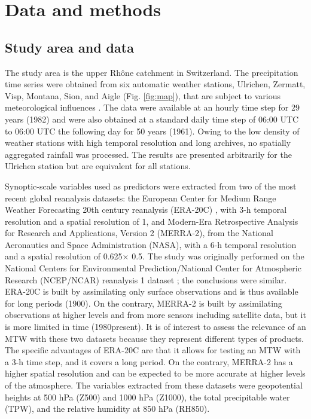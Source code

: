 \documentclass[hess, manuscript]{copernicus}
\begin{document}
	
	\section{Data and methods}
	\label{sec:data_methods}
	
	\subsection{Study area and data}
	\label{sec:data}
	
	The study area is the upper Rh\^{o}ne catchment in Switzerland. The precipitation time series were obtained from six automatic weather stations, Ulrichen, Zermatt, Visp, Montana, Sion, and Aigle (Fig. \ref{fig:map}), that are subject to various meteorological influences \citep{Horton2012}. The data were available at an hourly time step for 29 years (1982) and were also obtained at a standard daily time step of 06:00 UTC to 06:00 UTC the following day for 50 years (1961). Owing to the low density of weather stations with high temporal resolution and long archives, no spatially aggregated rainfall was processed. The results are presented arbitrarily for the Ulrichen station but are equivalent for all stations.
	
	Synoptic-scale variables used as predictors were extracted from two of the most recent global reanalysis datasets: the European Center for Medium Range Weather Forecasting 20th century reanalysis (ERA-20C) \citep{Poli2016}, with 3-h temporal resolution and a spatial resolution of 1\textdegree, and Modern-Era Retrospective Analysis for Research and Applications, Version 2 (MERRA-2), from the National Aeronautics and Space Administration (NASA), with a 6-h temporal resolution and a spatial resolution of 0.625\textdegree × 0.5\textdegree. The study was originally performed on the National Centers for Environmental Prediction/National Center for Atmospheric Research (NCEP/NCAR) reanalysis 1 dataset \citep{Kalnay1996}; the conclusions were similar. ERA-20C is built by assimilating only surface observations and is thus available for long periods (1900). On the contrary, MERRA-2 is built by assimilating observations at higher levels and from more sensors including satellite data, but it is more limited in time (1980\textendash present). It is of interest to assess the relevance of an MTW with these two datasets because they represent different types of products. The specific advantages of ERA-20C are that it allows for testing an MTW with a 3-h time step, and it covers a long period. On the contrary, MERRA-2 has a higher spatial resolution and can be expected to be more accurate at higher levels of the atmosphere. The variables extracted from these datasets were geopotential heights at 500 hPa (Z500) and 1000 hPa (Z1000), the total precipitable water (TPW), and the relative humidity at 850 hPa (RH850).
	
\end{document}
